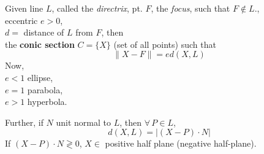 \begin{definition}\label{dgdt:Def:ConicSectionsVectorFormulation}
Given line $L$, called the \emph{directrix}, pt. $F$, the \emph{focus}, such that $F \notin L$., \\
\phantom{Given} eccentric $e > 0$, \\
\phantom{Given} $d = $ distance of $L$ from $F$, then \\
the \textbf{conic section} $C = \lbrace X \rbrace$ (set of all points) such that 
\begin{equation}\label{dgdt:Eq:ConicSectionVectorGeneralDefinition}
\| X - F \| = ed(X, L)
\end{equation}
Now, \\
$e < 1 $ ellipse, \\
$e = 1$ parabola, \\
$e > 1$ hyperbola.

Further, if $N$ unit normal to $L$, then $\forall \, P \in L$, 
\begin{equation}
d(X, L) = | (X- P) \cdot N |
\end{equation}
If $(X- P) \cdot N \gtrless 0$, $X \in $ positive half plane (negative half-plane). \\
\end{definition} 

